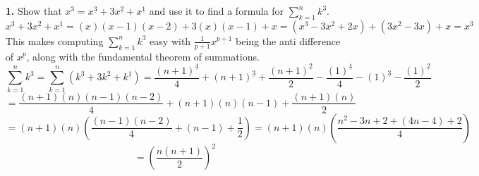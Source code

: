 \documentclass[12pt]{article}
\begin{document}
\begin{itemize}
		\item [\bfseries{1.}] Show that $x^3 = x^{\underline{3}} +3x^{\underline{2}} + x^{\underline{1}}$ and use it to find a formula for $\sum_{k=1}^{n} k^3$.\m
		\[x^{\underline{3}} +3x^{\underline{2}} + x^{\underline{1}} = (x)(x-1)(x-2) + 3(x)(x-1) + x = (x^3-3x^2+2x) + (3x^2-3x) + x  = x^3\]
		This makes computing $\sum_{k=1}^{n} k^3$ easy with $\frac{1}{p+1}x^{\underline{p+1}}$ being the anti difference of $x^{\underline{p}}$, along with the fundamental theorem of summations.
		\[\sum_{k=1}^{n} k^3 = \sum_{k=1}^{n} (k^{\underline{3}} +3k^{\underline{2}} + k^{\underline{1}}) = \frac{(n+1)^{\underline{4}}}{4} + (n+1)^{\underline{3}} + \frac{(n+1)^{\underline{2}}}{2} - \frac{(1)^{\underline{4}}}{4} - (1)^{\underline{3}} - \frac{(1)^{\underline{2}}}{2}\]
		\[= \frac{(n+1)(n)(n-1)(n-2)}{4} + (n+1)(n)(n-1) + \frac{(n+1)(n)}{2}\]
		\[= (n+1)(n)\left(\frac{(n-1)(n-2)}{4} + (n-1) + \frac{1}{2}\right) = (n+1)(n)\left(\frac{n^2-3n+2 + (4n-4) + 2}{4} \right)\]
		\[= \left(\frac{n(n+1)}{2}\right)^2\]
		
	\end{itemize}
\end{document}

